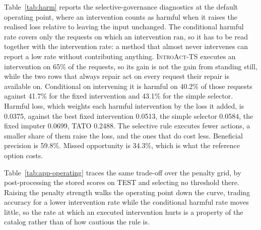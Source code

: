 \documentclass{article}
\newcommand{\introact}{\textsc{IntroAct-TS}}
\begin{document}
Table~\ref{tab:harm} reports the selective-governance diagnostics at the default operating
point, where an intervention counts as harmful when it raises the realised loss relative to
leaving the input unchanged. The conditional harmful rate covers only the requests on which an
intervention ran, so it has to be read together with the intervention rate: a method that
almost never intervenes can report a low rate without contributing anything. \introact{} executes an intervention on 65\% of the requests, so its gain is not the gain from standing still, while the two rows that always repair act on every request their repair is available on. Conditional on intervening it is harmful on 40.2\% of those requests against 41.7\% for the fixed intervention and 43.1\% for the simple selector. Harmful loss, which weights each harmful intervention by the loss it added, is 0.0375, against the best fixed intervention 0.0513, the simple selector 0.0584, the fixed imputer 0.0699, TATO 0.2488. The selective rule executes fewer actions, a smaller share of them raise the loss, and the ones that do cost less.
Beneficial precision is 59.8\%. Missed opportunity is 34.3\%, which is what the reference option costs.

Table~\ref{tab:app-operating} traces the same trade-off over the penalty grid, by
post-processing the stored scores on TEST and selecting no threshold there.
Raising the penalty strength walks the operating point down the curve, trading accuracy for a lower intervention rate while the conditional harmful rate moves little, so the rate at which an executed intervention hurts is a property of the catalog rather than of how cautious the rule is.
\end{document}
